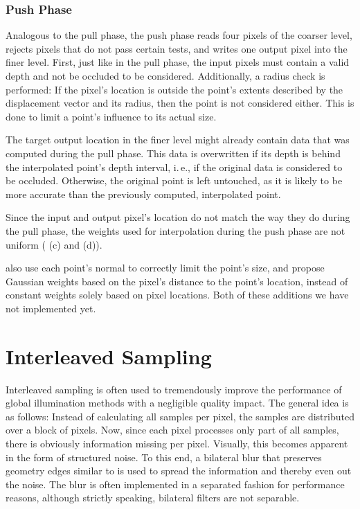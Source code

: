 \subsubsection{Push Phase}

Analogous to the pull phase, the push phase reads four pixels of the coarser level, rejects pixels that do not pass certain tests, and writes one output pixel into the finer level. First, just like in the pull phase, the input pixels must contain a valid depth and not be occluded to be considered. Additionally, a radius check is performed: If the pixel's location is outside the point's extents described by the displacement vector and its radius, then the point is not considered either. This is done to limit a point's influence to its actual size.

The target output location in the finer level might already contain data that was computed during the pull phase. This data is overwritten if its depth is behind the interpolated point's depth interval, i.\,e., if the original data is considered to be occluded. Otherwise, the original point is left untouched, as it is likely to be more accurate than the previously computed, interpolated point.

Since the input and output pixel's location do not match the way they do during the pull phase, the weights used for interpolation during the push phase are not uniform ( (c) and (d)).

 \citet{Marroquim:2007:reconstruction} also use each point's normal to correctly limit the point's size, and \citet{Marroquim:2008:reconstruction2} propose Gaussian weights based on the pixel's distance to the point's location, instead of constant weights solely based on pixel locations. Both of these additions we have not implemented yet.



 \section{Interleaved Sampling}
 \label{sec:concept:interleavedSampling}
 Interleaved sampling \citep{Keller:2001:InterleavedSampling} is often used to tremendously improve the performance of global illumination methods with a negligible quality impact. The general idea is as follows: Instead of calculating all samples per pixel, the samples are distributed over a block of pixels. Now, since each pixel processes only part of all samples, there is obviously information missing per pixel. Visually, this becomes apparent in the form of structured noise. To this end, a bilateral blur that preserves geometry edges similar to \citet{laine2007incremental} is used to spread the information and thereby even out the noise. The blur is often implemented in a separated fashion for performance reasons, although strictly speaking, bilateral filters are not separable.

